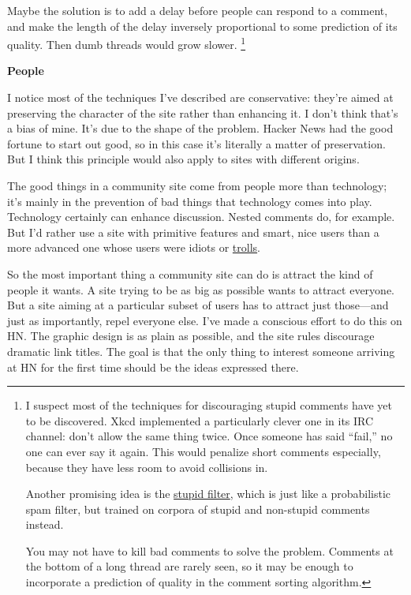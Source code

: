 Maybe the solution is to add a delay before people can respond to a
comment, and make the length of the delay inversely proportional to some
prediction of its quality. Then dumb threads would grow slower.
\footnote{I suspect most of the techniques for discouraging stupid
comments have yet to be discovered. Xkcd implemented a particularly
clever one in its IRC channel: don't allow the same thing twice. Once
someone has said ``fail,'' no one can ever say it again. This would
penalize short comments especially, because they have less room to avoid
collisions in.

Another promising idea is the \href{http://stupidfilter.org}{stupid
filter}, which is just like a probabilistic spam filter, but trained on
corpora of stupid and non-stupid comments instead.

You may not have to kill bad comments to solve the problem. Comments at
the bottom of a long thread are rarely seen, so it may be enough to
incorporate a prediction of quality in the comment sorting algorithm.}

\textbf{People}

I notice most of the techniques I've described are conservative: they're
aimed at preserving the character of the site rather than enhancing it.
I don't think that's a bias of mine. It's due to the shape of the
problem. Hacker News had the good fortune to start out good, so in this
case it's literally a matter of preservation. But I think this principle
would also apply to sites with different origins.

The good things in a community site come from people more than
technology; it's mainly in the prevention of bad things that technology
comes into play. Technology certainly can enhance discussion. Nested
comments do, for example. But I'd rather use a site with primitive
features and smart, nice users than a more advanced one whose users were
idiots or \href{trolls.html}{trolls}.

So the most important thing a community site can do is attract the kind
of people it wants. A site trying to be as big as possible wants to
attract everyone. But a site aiming at a particular subset of users has
to attract just those---and just as importantly, repel everyone else.
I've made a conscious effort to do this on HN. The graphic design is as
plain as possible, and the site rules discourage dramatic link titles.
The goal is that the only thing to interest someone arriving at HN for
the first time should be the ideas expressed there.


